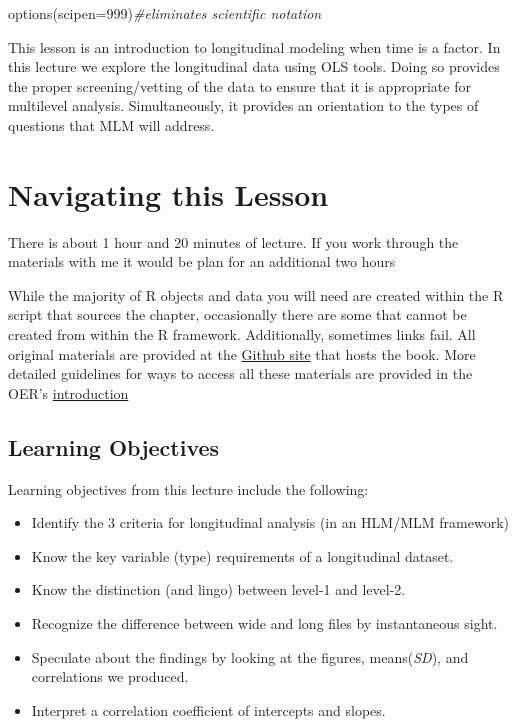\documentclass[
  11pt,
]{book}
\newenvironment{Shaded}{\begin{snugshade}}{\end{snugshade}}
\newcommand{\AttributeTok}[1]{\textcolor[rgb]{0.77,0.63,0.00}{#1}}
\newcommand{\CommentTok}[1]{\textcolor[rgb]{0.56,0.35,0.01}{\textit{#1}}}
\newcommand{\DecValTok}[1]{\textcolor[rgb]{0.00,0.00,0.81}{#1}}
\newcommand{\FunctionTok}[1]{\textcolor[rgb]{0.00,0.00,0.00}{#1}}
\newcommand{\NormalTok}[1]{#1}
\providecommand{\tightlist}{%
  \setlength{\itemsep}{0pt}\setlength{\parskip}{0pt}}
\begin{document}
\begin{Shaded}
\begin{Highlighting}[]
\FunctionTok{options}\NormalTok{(}\AttributeTok{scipen=}\DecValTok{999}\NormalTok{)}\CommentTok{\#eliminates scientific notation}
\end{Highlighting}
\end{Shaded}

This lesson is an introduction to longitudinal modeling when time is a factor. In this lecture we explore the longitudinal data using OLS tools. Doing so provides the proper screening/vetting of the data to ensure that it is appropriate for multilevel analysis. Simultaneously, it provides an orientation to the types of questions that MLM will address.

\hypertarget{navigating-this-lesson-1}{%
\section{Navigating this Lesson}\label{navigating-this-lesson-1}}

There is about 1 hour and 20 minutes of lecture. If you work through the materials with me it would be plan for an additional two hours

While the majority of R objects and data you will need are created within the R script that sources the chapter, occasionally there are some that cannot be created from within the R framework. Additionally, sometimes links fail. All original materials are provided at the \href{https://github.com/lhbikos/ReC_CPA}{Github site} that hosts the book. More detailed guidelines for ways to access all these materials are provided in the OER's \protect\hyperlink{ReCintro}{introduction}

\hypertarget{learning-objectives-1}{%
\subsection{Learning Objectives}\label{learning-objectives-1}}

Learning objectives from this lecture include the following:

\begin{itemize}
\tightlist
\item
  Identify the 3 criteria for longitudinal analysis (in an HLM/MLM framework)
\item
  Know the key variable (type) requirements of a longitudinal dataset.
\item
  Know the distinction (and lingo) between level-1 and level-2.
\item
  Recognize the difference between wide and long files by instantaneous sight.
\item
  Speculate about the findings by looking at the figures, means(\emph{SD}), and correlations we produced.
\item
  Interpret a correlation coefficient of intercepts and slopes.
\end{itemize}
\end{document}
